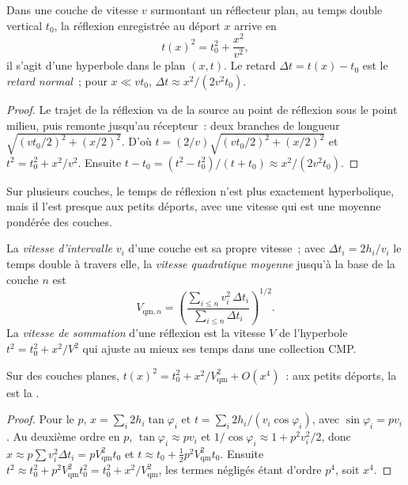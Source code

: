 \begin{theorem}\label{thm:b3:exploration-seismology:nmo}
Dans une couche de vitesse $v$ surmontant un réflecteur plan, au temps double vertical
$t_0$, la réflexion enregistrée au déport $x$ arrive en
\[
  t(x)^2 = t_0^2 + \frac{x^2}{v^2},
\]
il s'agit d'une hyperbole dans le plan $(x, t)$. Le retard $\Delta t = t(x) - t_0$ est le
\emph{retard normal}~; pour $x \ll vt_0$,
$\Delta t \approx x^2/(2v^2t_0)$.
\end{theorem}

\begin{proof}
Le trajet de la réflexion va de la source au point de réflexion sous le
point milieu, puis remonte jusqu'au récepteur~: deux branches de longueur
$\sqrt{(vt_0/2)^2 + (x/2)^2}$. D'où $t = (2/v)\sqrt{(vt_0/2)^2 + (x/2)^2}$ et
$t^2 = t_0^2 + x^2/v^2$. Ensuite $t - t_0 = (t^2 - t_0^2)/(t + t_0) \approx
x^2/(2v^2t_0)$.
\end{proof}

Sur plusieurs couches, le temps de réflexion n'est plus exactement hyperbolique, mais il
l'est presque aux petits déports, avec une vitesse qui est une moyenne pondérée des
couches.

\begin{definition}\label{def:b3:exploration-seismology:velocities}
La \emph{vitesse d'intervalle} $v_i$ d'une couche est sa
propre vitesse~; avec $\Delta t_i = 2h_i/v_i$ le temps double à travers elle, la
\emph{vitesse quadratique moyenne} jusqu'à la base
de la couche $n$ est
\[
  V_{\text{qm},n} = \left(\frac{\sum_{i\le n}v_i^2\,\Delta t_i}{\sum_{i\le n}\Delta t_i}\right)^{1/2}.
\]
La \emph{vitesse de sommation} d'une réflexion est la
vitesse $V$ de l'hyperbole $t^2 = t_0^2 + x^2/V^2$ qui ajuste au mieux ses temps dans une
collection CMP.
\end{definition}

\begin{proposition}\label{prop:b3:exploration-seismology:rms}
Sur des couches planes, $t(x)^2 = t_0^2 + x^2/V_{\text{qm}}^2 + O(x^4)$~: aux petits
déports, la  est la .
\end{proposition}

\begin{proof}
Pour le  $p$, $x = \sum_i 2h_i\tan\varphi_i$ et
$t = \sum_i 2h_i/(v_i\cos\varphi_i)$, avec $\sin\varphi_i = pv_i$. Au deuxième
ordre en $p$, $\tan\varphi_i \approx pv_i$ et $1/\cos\varphi_i \approx 1 +
p^2v_i^2/2$, donc $x \approx p\sum v_i^2\Delta t_i = pV_{\text{qm}}^2t_0$ et
$t \approx t_0 + \tfrac12p^2V_{\text{qm}}^2t_0$. Ensuite
$t^2 \approx t_0^2 + p^2V_{\text{qm}}^2t_0^2 = t_0^2 + x^2/V_{\text{qm}}^2$, les
termes négligés étant d'ordre $p^4$, soit $x^4$.
\end{proof}

